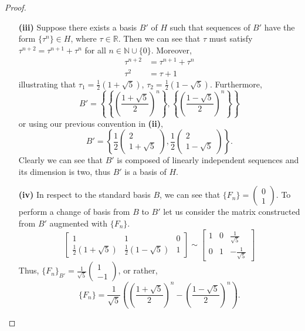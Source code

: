\documentclass[ 12pt ]{article}
\begin{document}
\begin{enumerate}
\begin{proof}
\begin{enumerate}
				\item[\textbf{(iii)}] Suppose there exists a basis $B'$ of $H$ such that sequences of $B'$ have the form $\{ \tau^n \} \in H$, where $\tau \in \mathbb{R}$. Then
					we can see that $\tau$ must satisfy $\tau^{n+2} = \tau^{n+1} + \tau^n$ for all $n \in \mathbb{N} \cup \{ 0 \}$. Moreover,
					\begin{align*}
						\tau^{n+2} &= \tau^{n+1} + \tau^n \\
						\tau^2 &= \tau + 1
					\end{align*}
					illustrating that $\tau_1 = \frac{1}{2}(1 + \sqrt{5})$, $\tau_2 = \frac{1}{2}(1 - \sqrt{5})$. Furthermore, $$B' = \left \{ \left \{ \left ( \frac{1 + \sqrt{5}}{2} 
					\right )^n \right \}, \left \{ \left ( \frac{1 - \sqrt{5}}{2} \right )^n \right \}\right \}$$ or using our previous convention in \textbf{(ii)},
					$$B' = \left \{ \frac{1}{2} \begin{pmatrix} 2 \\ 1 + \sqrt{5} \end{pmatrix}, \frac{1}{2} \begin{pmatrix} 2 \\ 1 - \sqrt{5} \end{pmatrix} \right \}.$$ Clearly we
					can see that $B'$ is composed of linearly independent sequences and its dimension is two, thus $B'$ is a basis of $H$.

				\item[\textbf{(iv)}] In respect to the standard basis $B$, we can see that $\{ F_n \} = \left ( \begin{smallmatrix} 0 \\ 1 \end{smallmatrix} \right )$. To perform a change
					of basis
					from $B$ to $B'$ let us consider the matrix constructed from $B'$ augmented with $\{ F_n \}$. $$\begin{bmatrix} 1 & 1 & 0 \\ \frac{1}{2}(1 + \sqrt{5})
					& \frac{1}{2}(1 - \sqrt{5}) & 1 \end{bmatrix} \sim \begin{bmatrix} 1 & 0 & \frac{1}{\sqrt{5}} \\ 0 & 1 & -\frac{1}{\sqrt{5}} \end{bmatrix}$$
					Thus, $\{ F_n \}_{B'} = \frac{1}{\sqrt{5}} \left ( \begin{smallmatrix} 1 \\ -1 \end{smallmatrix} \right )$, or rather, $$\{ F_n \} = \frac{1}{\sqrt{5}}
					\left ( \left ( \frac{1+\sqrt{5}}{2} \right )^n - \left ( \frac{1-\sqrt{5}}{2} \right )^n \right ).$$
			\end{enumerate}
		\end{proof}



\end{enumerate}
\end{document}
